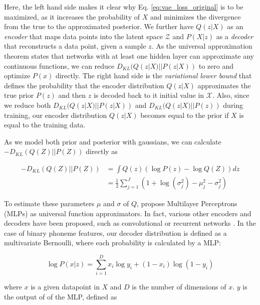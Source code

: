 \documentclass[6pt]{article}
\begin{document}
Here, the left hand side makes it clear why Eq. \ref{eq:vae_loss_original} is to be maximized, as it increases the probability of $X$ and minimizes the divergence from the true to the approximated posterior. We further have $Q(z|X)$ as an \textit{encoder} that maps data points into the latent space $\mathcal{Z}$ and $P(X|z)$ as a \textit{decoder} that reconstructs a data point, given a sample $z$. As the universal approximation theorem states that networks with at least one hidden layer can approximate any continuous functions, we can reduce $D_{KL}(Q(z|X)||P(z|X))$ to zero and optimize $P(x)$ directly. The right hand side is the \textit{variational lower bound} that defines the probability that the encoder distribution $Q(z|X)$ approximates the true prior $P(z)$ and then $z$ is decoded back to it initial value in $\mathcal{X}$. Also, since we reduce both $D_{KL}(Q(z|X)||P(z|X))$ and $D_{KL}(Q(z|X)||P(z))$ during training, our encoder distribution $Q(z|X)$ becomes equal to the prior if $X$ is equal to the training data.

As we model both prior and posterior with gaussians, we can calculate $-D_{KL}(Q(Z)||P(Z))$ directly as

\begin{equation}
\begin{split}
-D_{KL}(Q(Z)||P(Z)) & = \int Q(z) (\log P(z) - \log Q(Z)) dz\\
& = \frac{1}{2}\sum_{j=1}^{J}(1+\log(\sigma_j^2)-\mu_j^2-\sigma_j^2)
\end{split}
\end{equation}

To estimate these parameters $\mu$ and $\sigma$ of $Q$,  \cite{kingma2013auto} propose Multilayer Perceptrons (MLPs) as universal function approximators. In fact, various other encoders and decoders have been proposed, such as convolutional or recurrent networks \citep{kulkarni2015deep,bowman2015generating,fabius2014variational}. 
In the case of binary phoneme features, our decoder distribution is defined as a multivariate Bernoulli, where each probability is calculated by a MLP:

\begin{equation}
\log P(x|z) = \sum_{i=1}^{D} x_i \log y_i + (1-x_i) \log (1-y_i)
\label{eq:multivariate_bernoulli_prob}
\end{equation}

where $x$ is a given datapoint in $X$ and $D$ is the number of dimensions of $x$. $y$ is the output of of the MLP, defined as 
\end{document}
